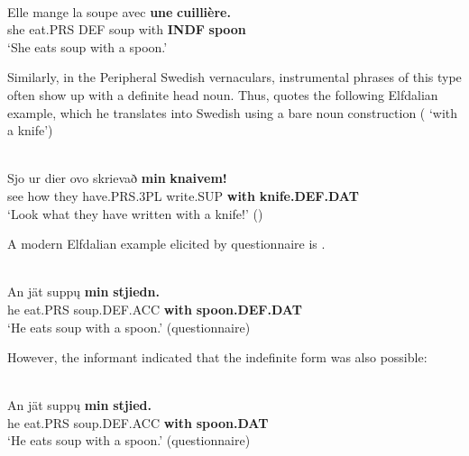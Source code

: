 \ea \label{} 
\\
\gll Elle  mange  la  soupe  avec  \textbf{une} \textbf{cuillière.}\\
she  eat.PRS  DEF  soup  with  \textbf{INDF} \textbf{spoon}\\
\glt ‘She eats soup with a spoon.’

\z

Similarly, in the Peripheral Swedish vernaculars, instrumental phrases of this type often show up with a definite head noun. Thus, \citet[126]{Levander1909} quotes the following Elfdalian example, which he translates into Swedish using a bare noun construction ( ‘with a knife’)

\ea \label{} 
\\
\gll Sjo  ur  dier  ovo  skrievað  \textbf{min} \textbf{  knaivem!}\\
see  how  they  have.PRS.3PL  write.SUP  \textbf{with} \textbf{knife.DEF.DAT}\\
\glt ‘Look what they have written with a knife!’ (\citet[125]{Levander1909})

\z

A modern Elfdalian example elicited by questionnaire is .


\ea \label{} 
\\
\gll An  jät  supp\k{u}  \textbf{min} \textbf{  stjiedn.}\\
he  eat.PRS  soup.DEF.ACC  \textbf{with} \textbf{spoon.DEF.DAT}\\
\glt ‘He eats soup with a spoon.’ (questionnaire)

\z

However, the informant indicated that the indefinite form was also possible:


\ea \label{} 
\\
\gll An  jät  supp\k{u}  \textbf{min} \textbf{  stjied.}\\
he  eat.PRS  soup.DEF.ACC  \textbf{with} \textbf{spoon.DAT}\\
\glt ‘He eats soup with a spoon.’ (questionnaire)

